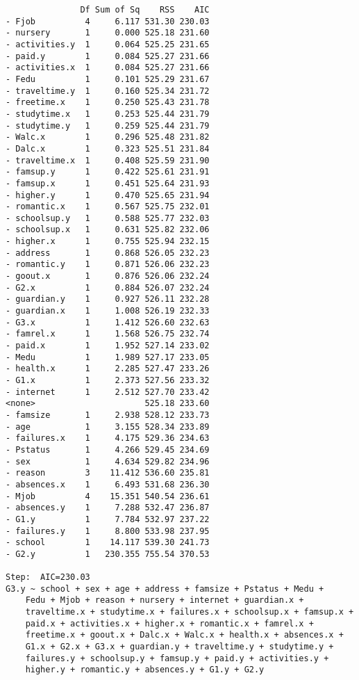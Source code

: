 \documentclass[11pt]{article}
\begin{document}
\begin{enumerate}
\begin{verbatim}
               Df Sum of Sq    RSS    AIC
- Fjob          4     6.117 531.30 230.03
- nursery       1     0.000 525.18 231.60
- activities.y  1     0.064 525.25 231.65
- paid.y        1     0.084 525.27 231.66
- activities.x  1     0.084 525.27 231.66
- Fedu          1     0.101 525.29 231.67
- traveltime.y  1     0.160 525.34 231.72
- freetime.x    1     0.250 525.43 231.78
- studytime.x   1     0.253 525.44 231.79
- studytime.y   1     0.259 525.44 231.79
- Walc.x        1     0.296 525.48 231.82
- Dalc.x        1     0.323 525.51 231.84
- traveltime.x  1     0.408 525.59 231.90
- famsup.y      1     0.422 525.61 231.91
- famsup.x      1     0.451 525.64 231.93
- higher.y      1     0.470 525.65 231.94
- romantic.x    1     0.567 525.75 232.01
- schoolsup.y   1     0.588 525.77 232.03
- schoolsup.x   1     0.631 525.82 232.06
- higher.x      1     0.755 525.94 232.15
- address       1     0.868 526.05 232.23
- romantic.y    1     0.871 526.06 232.23
- goout.x       1     0.876 526.06 232.24
- G2.x          1     0.884 526.07 232.24
- guardian.y    1     0.927 526.11 232.28
- guardian.x    1     1.008 526.19 232.33
- G3.x          1     1.412 526.60 232.63
- famrel.x      1     1.568 526.75 232.74
- paid.x        1     1.952 527.14 233.02
- Medu          1     1.989 527.17 233.05
- health.x      1     2.285 527.47 233.26
- G1.x          1     2.373 527.56 233.32
- internet      1     2.512 527.70 233.42
<none>                      525.18 233.60
- famsize       1     2.938 528.12 233.73
- age           1     3.155 528.34 233.89
- failures.x    1     4.175 529.36 234.63
- Pstatus       1     4.266 529.45 234.69
- sex           1     4.634 529.82 234.96
- reason        3    11.412 536.60 235.81
- absences.x    1     6.493 531.68 236.30
- Mjob          4    15.351 540.54 236.61
- absences.y    1     7.288 532.47 236.87
- G1.y          1     7.784 532.97 237.22
- failures.y    1     8.800 533.98 237.95
- school        1    14.117 539.30 241.73
- G2.y          1   230.355 755.54 370.53

Step:  AIC=230.03
G3.y ~ school + sex + age + address + famsize + Pstatus + Medu + 
    Fedu + Mjob + reason + nursery + internet + guardian.x + 
    traveltime.x + studytime.x + failures.x + schoolsup.x + famsup.x + 
    paid.x + activities.x + higher.x + romantic.x + famrel.x + 
    freetime.x + goout.x + Dalc.x + Walc.x + health.x + absences.x + 
    G1.x + G2.x + G3.x + guardian.y + traveltime.y + studytime.y + 
    failures.y + schoolsup.y + famsup.y + paid.y + activities.y + 
    higher.y + romantic.y + absences.y + G1.y + G2.y


\end{verbatim}
\end{enumerate}
\end{document}
